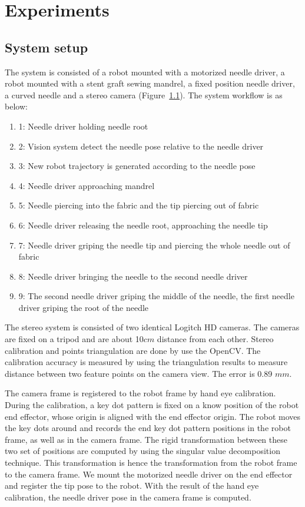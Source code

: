 \section{Experiments}

\subsection{System setup}
The system is consisted of a robot mounted with a motorized needle driver, a robot mounted with a stent graft sewing mandrel, a fixed position needle driver, a curved needle and a stereo camera (Figure~\ref{}). The system workflow is as below:

\begin{enumerate}
\item{1}: Needle driver holding needle root
\item{2}: Vision system detect the needle pose relative to the needle driver
\item{3}: New robot trajectory is generated according to the needle pose
\item{4}: Needle driver approaching mandrel
\item{5}: Needle piercing into the fabric and the tip piercing out of fabric
\item{6}: Needle driver releasing the needle root, approaching the needle tip
\item{7}: Needle driver griping the needle tip and piercing the whole needle out of fabric
\item{8}: Needle driver bringing the needle to the second needle driver
\item{9}: The second needle driver griping the middle of the needle, the first needle driver griping the root of the needle
\end{enumerate}

The stereo system is consisted of two identical Logitch HD cameras. The cameras are fixed on a tripod and are about 10$cm$ distance from each other. Stereo calibration and points triangulation are done by use the OpenCV. The calibration accuracy is measured by using the triangulation results to measure distance between two feature points on the camera view. The error is 0.89 $mm$.

The camera frame is registered to the robot frame by hand eye calibration. During the calibration, a key dot pattern is fixed on a know position of the robot end effector, whose origin is aligned with the end effector origin. The robot moves the key dots around and records the end key dot pattern positions in the robot frame, as well as in the camera frame. The rigid transformation between these two set of positions are computed by using the singular value decomposition technique. This transformation is hence the transformation from the robot frame to the camera frame. We mount the motorized needle driver on the end effector and register the tip pose to the robot. With the result of the hand eye calibration, the needle driver pose in the camera frame is computed.

